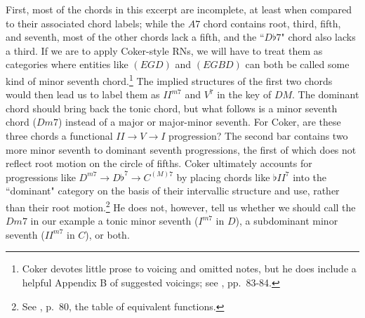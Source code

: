 First, most of the chords in this excerpt are incomplete, at least when compared to their associated chord labels; while the $A7$ chord contains root, third, fifth, and seventh, most of the other chords lack a fifth, and the ``$D\flat7$" chord also lacks a third.  If we are to apply Coker-style RNs, we will have to treat them as categories where entities like $(EGD)$ and $(EGBD)$ can both be called some kind of minor seventh chord.\footnote{Coker devotes little prose to voicing and omitted notes, but he does include a helpful Appendix B of suggested voicings; see \cite{coker1964}, pp.\ 83-84.}  The implied structures of the first two chords would then lead us to label them as $II^{m7}$ and $V^7$ in the key of $DM$.  The dominant chord should bring back the tonic chord, but what follows is a minor seventh chord ($Dm7$) instead of a major or major-minor seventh.  For Coker, are these three chords a functional $II \rightarrow V \rightarrow I$ progression?  The second bar contains two more minor seventh to dominant seventh progressions, the first of which does not reflect root motion on the circle of fifths.  Coker ultimately accounts for progressions like $D^{m7} \rightarrow D\flat^7 \rightarrow C^{(M)7}$ by placing chords like $\flat II^7$ into the ``dominant" category on the basis of their intervallic structure and use, rather than their root motion.\footnote{See \cite{coker1964}, p.\ 80, the table of equivalent functions.}  He does not, however, tell us whether we should call the $Dm7$ in our example a tonic minor seventh ($I^{m7}$ in $D$), a subdominant minor seventh ($II^{m7}$ in $C$), or both.

